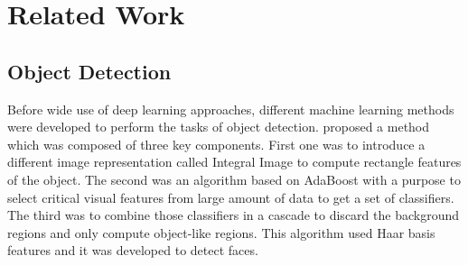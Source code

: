 \documentclass[11pt]{article}
\begin{document}

\section{Related Work}
\subsection{Object Detection}
Before wide use of deep learning approaches, different machine learning methods were developed to perform the tasks of object detection. \cite{viola2001rapid} proposed a method which was composed of three key components. First one was to introduce a different image representation called Integral Image to compute rectangle features of the object. The second was an algorithm based on AdaBoost with a purpose to select critical visual features from large amount of data to get a set of classifiers. The third was to combine those classifiers in a cascade to discard the background regions and only compute object-like regions. This algorithm used Haar basis features and it was developed to detect faces.
\end{document}
